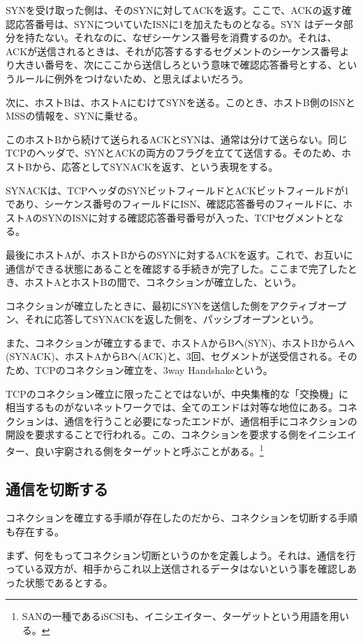 SYNを受け取った側は、そのSYNに対してACKを返す。ここで、ACKの返す確認応答番号は、SYNについていたISNに1を加えたものとなる。SYN はデータ部分を持たない。それなのに、なぜシーケンス番号を消費するのか。それは、ACKが送信されるときは、それが応答するするセグメントのシーケンス番号より大きい番号を、次にここから送信しろという意味で確認応答番号とする、というルールに例外をつけないため、と思えばよいだろう。

次に、ホストBは、ホストAにむけてSYNを送る。このとき、ホストB側のISNとMSSの情報を、SYNに乗せる。

このホストBから続けて送られるACKとSYNは、通常は分けて送らない。同じTCPのヘッダで、SYNとACKの両方のフラグを立てて送信する。そのため、ホストBから、応答としてSYNACKを返す、という表現をする。

SYNACKは、TCPヘッダのSYNビットフィールドとACKビットフィールドが1であり、シーケンス番号のフィールドにISN、確認応答番号のフィールドに、ホストAのSYNのISNに対する確認応答番号番号が入った、TCPセグメントとなる。

最後にホストAが、ホストBからのSYNに対するACKを返す。これで、お互いに通信ができる状態にあることを確認する手続きが完了した。ここまで完了したとき、ホストAとホストBの間で、コネクションが確立した、という。

コネクションが確立したときに、最初にSYNを送信した側をアクティブオープン、それに応答してSYNACKを返した側を、パッシブオープンという。

また、コネクションが確立するまで、ホストAからBへ(SYN)、ホストBからAへ(SYNACK)、ホストAからBへ(ACK)と、3回、セグメントが送受信される。そのため、TCPのコネクション確立を、3way Handshakeという。

TCPのコネクション確立に限ったことではないが、中央集権的な「交換機」に相当するものがないネットワークでは、全てのエンドは対等な地位にある。コネクションは、通信を行うこと必要になったエンドが、通信相手にコネクションの開設を要求することで行われる。この、コネクションを要求する側をイニシエイター、良い宇窮される側をターゲットと呼ぶことがある。\footnote{SANの一種であるiSCSIも、イニシエイター、ターゲットという用語を用いる。}


\subsection{通信を切断する}
コネクションを確立する手順が存在したのだから、コネクションを切断する手順も存在する。

まず、何をもってコネクション切断というのかを定義しよう。それは、通信を行っている双方が、相手からこれ以上送信されるデータはないという事を確認しあった状態であるとする。

